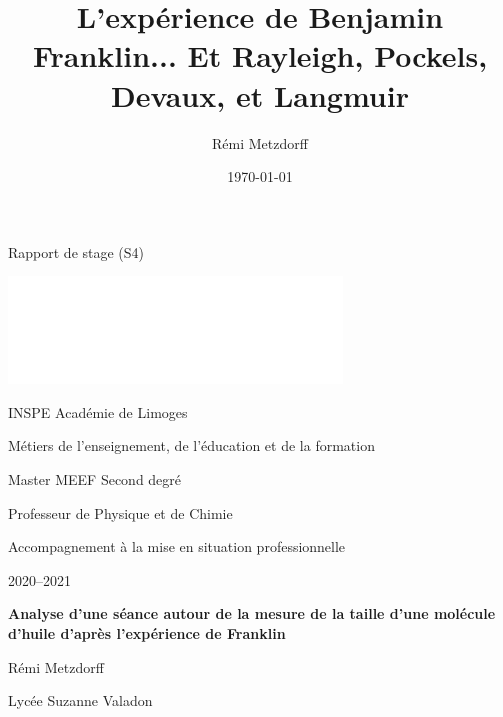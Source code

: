 \documentclass[12pt,a4paper, fleqn]{article}
\title{L'expérience de Benjamin Franklin... Et Rayleigh, Pockels, Devaux, et Langmuir}
\author{Rémi Metzdorff}
\date{\today}
\newenvironment{header}
{%
	\addcontentsline{ldf}{figure}{0}%
	\begin{header_env}\qquad\Large\bf}
	{\end{header_env}}
\begin{document}

\begin{header}
\begin{minipage}{0.55\textwidth}
Rapport de stage (S4)
\end{minipage}
\begin{minipage}{0.38\textwidth}
\href{https://www.unilim.fr/}{\includegraphics[scale=1]{logo.png}}
\end{minipage}
\end{header}

\vspace{30pt}
\begin{spacing}{1.2}
{\bf
\begin{Large}
\noindent
\textcolor{gray_unilim}{INSPE Académie de Limoges}
\end{Large}

\begin{large}
\noindent
\textcolor{gray_unilim}{Métiers de l'enseignement, de l'éducation et de la formation}

\noindent
\textcolor{gray_unilim}{Master MEEF Second degré}

\noindent
\textcolor{gray_unilim}{Professeur de Physique et de Chimie}

\noindent
\textcolor{gray_unilim}{Accompagnement à la mise en situation professionnelle}

\end{large}
}

\vspace{20pt}

\noindent
\textcolor{gray_unilim}{2020--2021}

\vspace{40pt}
\begin{large}
\bf
\noindent
\textcolor{gray_unilim}{Analyse d'une séance autour de la mesure de la taille d'une molécule d'huile d'après l'expérience de Franklin}

\vspace{150pt}
\noindent
\textcolor{gray_unilim}{Rémi Metzdorff}

\noindent
\textcolor{gray_unilim}{Lycée Suzanne Valadon}
\end{large}
\end{spacing}
\end{document}
